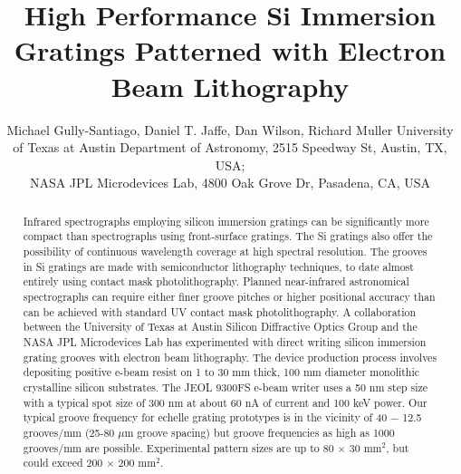 \documentclass[]{spie}  %
\title{High Performance Si Immersion Gratings Patterned with Electron Beam Lithography}
\author{Michael Gully-Santiago\supit{a}, Daniel T. Jaffe\supit{a}, Dan Wilson\supit{b}, Richard Muller\supit{b}
\skiplinehalf
\supit{a}University of Texas at Austin Department of Astronomy, 2515 Speedway St, Austin, TX, USA; \\
\supit{b}NASA JPL Microdevices Lab, 4800 Oak Grove Dr, Pasadena, CA, USA
}
\begin{document}
 
  \maketitle 

\begin{abstract}
Infrared spectrographs employing silicon immersion gratings can be significantly more compact than spectrographs using front-surface gratings.  The Si gratings also offer the possibility of continuous wavelength coverage at high spectral resolution.  The grooves in Si gratings are made with semiconductor lithography techniques, to date almost entirely using contact mask photolithography.  Planned near-infrared astronomical spectrographs can require either finer groove pitches or higher positional accuracy than can be achieved with standard UV contact mask photolithography.  A collaboration between the University of Texas at Austin Silicon Diffractive Optics Group and the NASA JPL Microdevices Lab has experimented with direct writing silicon immersion grating grooves with electron beam lithography.  The device production process involves depositing positive e-beam resist on 1 to 30 mm thick, 100 mm diameter monolithic crystalline silicon substrates.  The JEOL 9300FS e-beam writer uses a 50 nm step size with a typical spot size of 300 nm at about 60 nA of current and 100 keV power.  Our typical groove frequency for echelle grating prototypes is in the vicinity of 40 $-$ 12.5 grooves/mm (25-80 $\mu$m groove spacing) but groove frequencies as high as 1000 grooves/mm are possible.  Experimental pattern sizes are up to 80 $\times$ 30 mm$^2$, but could exceed 200 $\times$ 200 mm$^2$.


\end{abstract}
\end{document}
